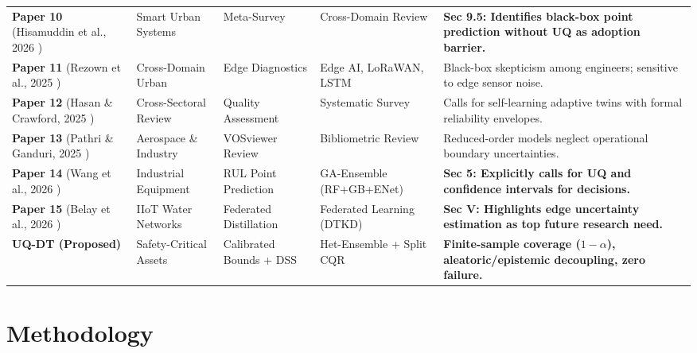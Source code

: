 \documentclass[journal,10pt,twocolumn]{article}
\begin{document}
\begin{table}[t]
\begin{tabular}{lp{3.2cm}p{3.2cm}p{3.4cm}p{4.2cm}}
\textbf{Paper 10} (Hisamuddin et al., 2026 \cite{hisamuddin2026ai}) & Smart Urban Systems & Meta-Survey & Cross-Domain Review & \textbf{Sec 9.5: Identifies black-box point prediction without UQ as adoption barrier.} \\
\textbf{Paper 11} (Rezown et al., 2025 \cite{rezown2025ai}) & Cross-Domain Urban & Edge Diagnostics & Edge AI, LoRaWAN, LSTM & Black-box skepticism among engineers; sensitive to edge sensor noise. \\
\textbf{Paper 12} (Hasan \& Crawford, 2025 \cite{hasan2025new}) & Cross-Sectoral Review & Quality Assessment & Systematic Survey & Calls for self-learning adaptive twins with formal reliability envelopes. \\
\textbf{Paper 13} (Pathri \& Ganduri, 2025 \cite{pathri2025digital}) & Aerospace \& Industry & VOSviewer Review & Bibliometric Review & Reduced-order models neglect operational boundary uncertainties. \\
\textbf{Paper 14} (Wang et al., 2026 \cite{wang2026digital}) & Industrial Equipment & RUL Point Prediction & GA-Ensemble (RF+GB+ENet) & \textbf{Sec 5: Explicitly calls for UQ and confidence intervals for decisions.} \\
\textbf{Paper 15} (Belay et al., 2026 \cite{belay2026digital}) & IIoT Water Networks & Federated Distillation & Federated Learning (DTKD) & \textbf{Sec V: Highlights edge uncertainty estimation as top future research need.} \\
\midrule
\textbf{UQ-DT (Proposed)} & Safety-Critical Assets & Calibrated Bounds + DSS & Het-Ensemble + Split CQR & \textbf{Finite-sample coverage ($1-\alpha$), aleatoric/epistemic decoupling, zero failure.} \\
\bottomrule
\end{tabular}
\end{table}

\section{Methodology}
\end{document}
